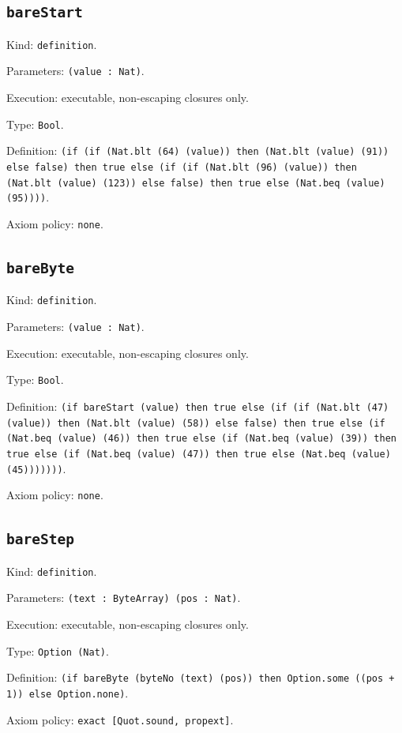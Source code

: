 \documentclass[11pt]{article}
\begin{document}
\subsection*{\texttt{bareStart}}
\noindent Kind: \texttt{definition}.\par
\noindent Parameters: \texttt{(value : Nat)}.\par
\noindent Execution: executable, non-escaping closures only.\par
\noindent Type: \texttt{Bool}.\par
\noindent Definition: \texttt{(if (if (Nat.blt (64) (value)) then (Nat.blt (value) (91)) else false) then true else (if (if (Nat.blt (96) (value)) then (Nat.blt (value) (123)) else false) then true else (Nat.beq (value) (95))))}.\par
\noindent Axiom policy: \texttt{none}.\par
\subsection*{\texttt{bareByte}}
\noindent Kind: \texttt{definition}.\par
\noindent Parameters: \texttt{(value : Nat)}.\par
\noindent Execution: executable, non-escaping closures only.\par
\noindent Type: \texttt{Bool}.\par
\noindent Definition: \texttt{(if bareStart (value) then true else (if (if (Nat.blt (47) (value)) then (Nat.blt (value) (58)) else false) then true else (if (Nat.beq (value) (46)) then true else (if (Nat.beq (value) (39)) then true else (if (Nat.beq (value) (47)) then true else (Nat.beq (value) (45)))))))}.\par
\noindent Axiom policy: \texttt{none}.\par
\subsection*{\texttt{bareStep}}
\noindent Kind: \texttt{definition}.\par
\noindent Parameters: \texttt{(text : ByteArray) (pos : Nat)}.\par
\noindent Execution: executable, non-escaping closures only.\par
\noindent Type: \texttt{Option (Nat)}.\par
\noindent Definition: \texttt{(if bareByte (byteNo (text) (pos)) then Option.some ((pos + 1)) else Option.none)}.\par
\noindent Axiom policy: \texttt{exact [Quot.sound, propext]}.\par
\end{document}
